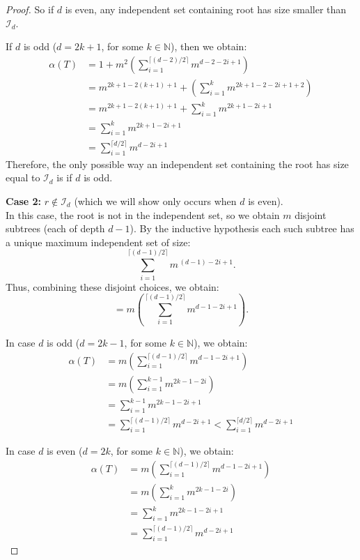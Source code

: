 \documentclass{amsart}
\theoremstyle{definition}
\newcommand\II{{\mathcal I}}
\begin{document}
\begin{proof}
	So if $d$ is even, any independent set containing root has size smaller than $\II_d$.
	\newline

	If $d$ is odd ($d = 2k + 1$, for some $k \in \mathbb{N}$), then we obtain:
	\begin{align*}
		\alpha(T) & = 1 + m^2\left(\sum_{i=1}^{\lceil (d-2)/2 \rceil} m^{d - 2 -2i+1}\right)                \\
		          & = m^{2k + 1 - 2(k + 1) + 1} + \left(\sum_{i = 1}^{k} m^{2k + 1 - 2 - 2i + 1 + 2}\right) \\
		          & = m^{2k + 1 - 2(k + 1) + 1} + \sum_{i = 1}^{k} m^{2k + 1 - 2i + 1}                      \\
		          & = \sum_{i = 1}^{k} m^{2k + 1 - 2i + 1}                                                  \\
		          & = \sum_{i = 1}^{\lceil d/2 \rceil}m^{d-2i+1}
	\end{align*}
	Therefore, the only possible way an independent set containing the root has size equal to $\II_d$ is if $d$ is odd.

	\medskip

	\textbf{Case 2:} $r\notin \mathcal{I}_{d}$ (which we will show only occurs when $d$ is even).\\[1mm]
	In this case, the root is not in the independent set, so we obtain $m$ disjoint subtrees (each of depth $d-1$). By the inductive hypothesis each such subtree has a unique maximum independent set of size:
	\[
		\sum_{i=1}^{\lceil (d-1)/2 \rceil} m^{\, (d-1)-2i+1}.
	\]
	Thus, combining these disjoint choices, we obtain:
	\[
		= m\left(\sum_{i=1}^{\lceil (d-1)/2 \rceil} m^{d-1-2i+1}\right).
	\]

	In case $d$ is odd ($d = 2k - 1$, for some $k \in \mathbb{N}$), we obtain:
	\begin{align*}
		\alpha(T) & = m\left(\sum_{i=1}^{\lceil (d-1)/2 \rceil} m^{d - 1 -2i+1}\right) \\
		          & = m\left(\sum_{i=1}^{k - 1} m^{2k - 1 - 2i}\right)                 \\
		          & = \sum_{i=1}^{k - 1} m^{2k - 1 - 2i + 1}                           \\
		          & = \sum_{i = 1}^{\lceil (d - 1)/ 2\rceil}m^{d-2i+1}
		< \sum_{i = 1}^{\lceil d/2 \rceil}m^{d - 2i + 1}
	\end{align*}

	In case $d$ is even ($d = 2k$, for some $k \in \mathbb{N}$), we obtain:
	\begin{align*}
		\alpha(T) & = m\left(\sum_{i=1}^{\lceil (d-1)/2 \rceil} m^{d - 1 -2i+1}\right) \\
		          & = m\left(\sum_{i=1}^{k} m^{2k - 1 - 2i}\right)                     \\
		          & = \sum_{i=1}^{k} m^{2k - 1 - 2i + 1}                               \\
		          & = \sum_{i = 1}^{\lceil (d - 1)/ 2\rceil}m^{d-2i+1}
	\end{align*}


\end{proof}
\end{document}

